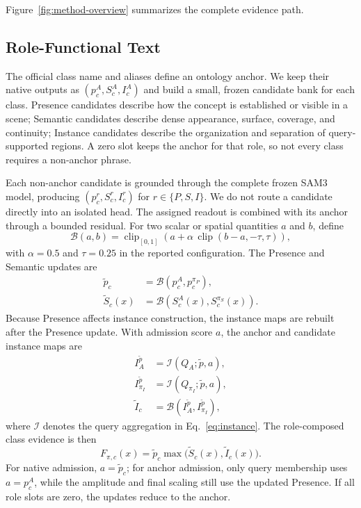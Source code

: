  Figure~\ref{fig:method-overview} summarizes the complete evidence path.

\subsection{Role-Functional Text}

The official class name and aliases define an ontology anchor. We keep their native outputs as $(p_c^A,S_c^A,I_c^A)$ and build a small, frozen candidate bank for each class. Presence candidates describe how the concept is established or visible in a scene; Semantic candidates describe dense appearance, surface, coverage, and continuity; Instance candidates describe the organization and separation of query-supported regions. A zero slot keeps the anchor for that role, so not every class requires a non-anchor phrase.

Each non-anchor candidate is grounded through the complete frozen SAM3 model, producing $(p_c^r,S_c^r,I_c^r)$ for $r\in\{P,S,I\}$. We do not route a candidate directly into an isolated head. The assigned readout is combined with its anchor through a bounded residual. For two scalar or spatial quantities $a$ and $b$, define
\begin{equation}
\mathcal B(a,b)=\operatorname{clip}_{[0,1]}\!\left(a+\alpha\,\operatorname{clip}(b-a,-\tau,\tau)\right),
\label{eq:bounded}
\end{equation}
with $\alpha=0.5$ and $\tau=0.25$ in the reported configuration. The Presence and Semantic updates are
\begin{equation}
\begin{aligned}
\tilde p_c&=\mathcal B(p_c^A,p_c^{\pi_P}),\\
\tilde S_c(x)&=\mathcal B(S_c^A(x),S_c^{\pi_S}(x)).
\end{aligned}
\label{eq:role-updates}
\end{equation}
Because Presence affects instance construction, the instance maps are rebuilt after the Presence update. With admission score $a$, the anchor and candidate instance maps are
\begin{equation}
\begin{aligned}
I_A^{\tilde p}&=\mathcal I(Q_A;\tilde p,a),\\
I_{\pi_I}^{\tilde p}&=\mathcal I(Q_{\pi_I};\tilde p,a),\\
\tilde I_c&=\mathcal B(I_A^{\tilde p},I_{\pi_I}^{\tilde p}),
\end{aligned}
\label{eq:instance-rebuild}
\end{equation}
where $\mathcal I$ denotes the query aggregation in Eq.~\eqref{eq:instance}. The role-composed class evidence is then
\begin{equation}
F_{\pi,c}(x)=\tilde p_c\max\bigl(\tilde S_c(x),\tilde I_c(x)\bigr).
\label{eq:role-final}
\end{equation}
For native admission, $a=\tilde p_c$; for anchor admission, only query membership uses $a=p_c^A$, while the amplitude and final scaling still use the updated Presence. If all role slots are zero, the updates reduce to the anchor.

